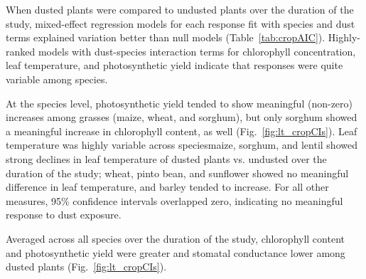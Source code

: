\documentclass{svjour3}
\begin{document}
When dusted plants were compared to undusted plants over the duration of the study, mixed-effect regression models for each response fit with species and dust terms explained variation better than null models (Table~\ref{tab:cropAIC}). 
Highly-ranked models with dust-species interaction terms for chlorophyll concentration, leaf temperature, and photosynthetic yield indicate that responses were quite variable among species. 

At the species level, photosynthetic yield tended to show meaningful (non-zero) increases among grasses (maize, wheat, and sorghum), but only sorghum showed a meaningful increase in chlorophyll content, as well (Fig.~\ref{fig:lt_cropCIs}). 
Leaf temperature was highly variable across species\textemdash maize, sorghum, and lentil showed strong declines in leaf temperature of dusted plants vs. undusted over the duration of the study; wheat, pinto bean, and sunflower showed no meaningful difference in leaf temperature, and barley tended to increase. 
For all other measures, 95\% confidence intervals overlapped zero, indicating no meaningful response to dust exposure. 

Averaged across all species over the duration of the study, chlorophyll content and photosynthetic yield were greater and stomatal conductance lower among dusted plants (Fig.~\ref{fig:lt_cropCIs}). 


 
\end{document}

